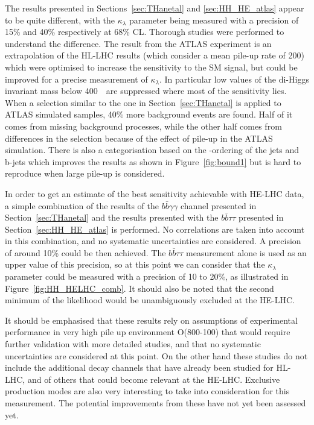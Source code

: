 The results presented in Sections~\ref{sec:THanetal} and \ref{sec:HH_HE_atlas} appear to be quite different, with the $\kappa_{\lambda}$ parameter being measured with a precision of 15\% and 40\% respectively at 68\% CL.
Thorough studies were performed to understand the difference. The result from the ATLAS experiment is an extrapolation of the HL-LHC results (which consider a mean pile-up rate of 200) which were optimised to increase the sensitivity to the SM signal, but could be improved for a precise measurement of $\kappa_{\lambda}$. In particular low values of the di-Higgs invariant mass below 400~\GeV\ are suppressed where most of the sensitivity lies.
When a selection similar to the one in Section~\ref{sec:THanetal} is applied to ATLAS simulated samples, 40\% more background events are found. Half of it comes from missing background processes, while the other half comes from differences in the selection because of the effect of pile-up in the ATLAS simulation.
There is also a categorisation based on the \pT-ordering of the jets and b-jets which improves the results as shown in Figure~\ref{fig:bound1} but is hard to reproduce when large pile-up is considered.


In order to get an estimate of the best sensitivity achievable with HE-LHC data, a simple combination of the results of the $b\bar{b}\gamma\gamma$ channel presented in Section~\ref{sec:THanetal} and the results presented with the $b\bar{b}\tau\tau$ presented in Section~\ref{sec:HH_HE_atlas} is performed. No correlations are taken into account in this combination, and no systematic uncertainties are considered. A precision of around 10\% could be then achieved. The $b\bar{b}\tau\tau$ measurement alone is used as an upper value of this precision, so at this point we can consider that the $\kappa_{\lambda}$ parameter could be measured with a precision of 10 to 20\%, as illustrated in Figure~\ref{fig:HH_HELHC_comb}. It should also be noted that the second minimum of the likelihood would be unambiguously excluded at the HE-LHC.

It should be emphasised that these results rely on assumptions of experimental performance in very high pile up environment O(800-100) that would require further validation with more detailed studies, and that no systematic uncertainties are considered at this point. On the other hand these studies do not include the additional decay channels that have already been studied for HL-LHC, and of others that could become relevant at the HE-LHC. Exclusive production modes are also very interesting to take into consideration for this measurement. The potential improvements from these have not yet been assessed yet.


